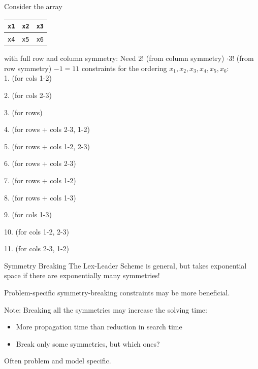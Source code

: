 \documentclass{cons-beamer}
\begin{document}
\begin{frame}[fragile]
  \begin{example}
    \small
    Consider the array
    \begin{tabular}{|c|c|c|}
      \hline
      \texttt{x1} & \texttt{x2} & \texttt{x3} \\
      \hline
      \texttt{x4} & \texttt{x5} & \texttt{x6} \\
      \hline
    \end{tabular}
    with full row and column symmetry: Need
    $2!$ (from column symmetry) $ \cdot 3!$ (from row symmetry) $ - 1 = 11$ constraints for the ordering
    $x_1,x_2,x_3,x_4,x_5,x_6$:
\\[+10pt]
1.  (for cols 1-2)  

2.  (for cols 2-3)  

3.  (for rows)  

4.  (for rows + cols 2-3, 1-2)  

5.  (for rows + cols 1-2, 2-3)  

6.  (for rows + cols 2-3)  

7.  (for rows + cols 1-2)  

8.  (for rows + cols 1-3)  

9.  (for cols 1-3)  

10.  (for cols 1-2, 2-3)  

11.  (for cols 2-3, 1-2)  

  \end{example}
\end{frame}

\begin{frame}{Symmetry Breaking}
  The Lex-Leader Scheme is general, but takes exponential
  space if there are exponentially many symmetries!
  \vfill

  Problem-specific symmetry-breaking constraints may be more beneficial.
  \vfill

  Note: Breaking \alert{all} the symmetries may increase the solving time:
  \begin{itemize}
    \item More propagation time than reduction in search time
    \item Break only \alert{some} symmetries, but which ones?
  \end{itemize}
  \vfill

  Often problem and model specific.
\end{frame}
\end{document}
